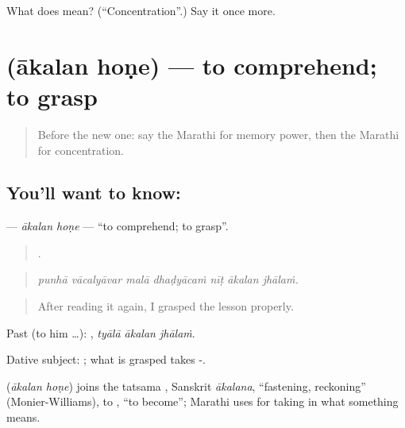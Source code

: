 \begin{tcolorbox}[breakable,colback=teal!4,colframe=teal!35!black,title={Before you move on}]
What does  mean? (\textquotedblleft{}Concentration\textquotedblright{}.) Say it once more.
\end{tcolorbox}
\section[\texorpdfstring{\mr{आकलन} \mr{होणे} (ākalan hoṇe)}{आकलन होणे (ākalan hoṇe)}]{  (ākalan hoṇe) — to comprehend; to grasp}

\label{lesson:MR-C375-akalan-hone}



\begin{quote}
Before the new one: say the Marathi for memory power, then the Marathi for concentration.
\end{quote}

\subsection*{You'll want to know:  }
\textbf{ } — \emph{ākalan hoṇe} — \textquotedblleft{}to comprehend; to grasp\textquotedblright{}.

\begin{quote}
      .
\end{quote}

\begin{quote}
\emph{punhā vācalyāvar malā dhaḍyācaṁ nīṭ ākalan jhālaṁ.}
\end{quote}

\begin{quote}
After reading it again, I grasped the lesson properly.
\end{quote}

Past (to him …):   , \emph{tyālā ākalan jhālaṁ}.

Dative subject:   ; what is grasped takes -.

\begin{cousinweb}
\textbf{ } (\emph{ākalan hoṇe}) joins the tatsama , Sanskrit \emph{ākalana}, \textquotedblleft{}fastening, reckoning\textquotedblright{} (Monier-Williams), to , \textquotedblleft{}to become\textquotedblright{}; Marathi uses  for taking in what something means.
\end{cousinweb}

